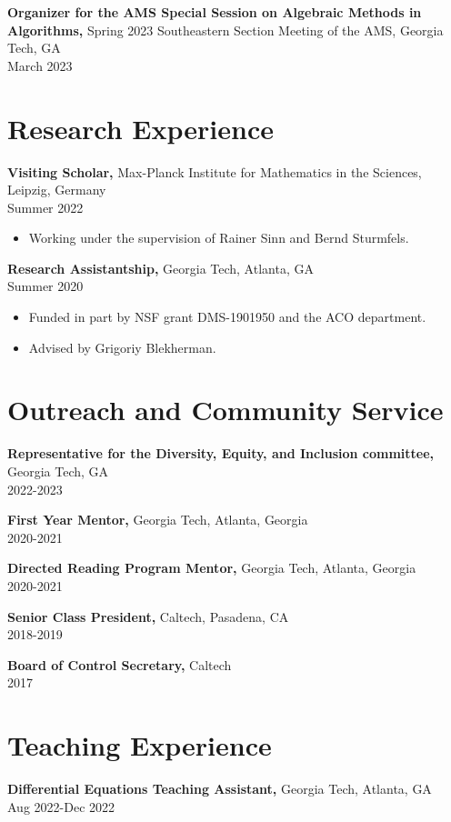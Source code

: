 \documentclass[margin]{res}
\begin{document}
\begin{resume}
{\bf Organizer for the AMS Special Session on Algebraic Methods in Algorithms,} Spring 2023 Southeastern Section Meeting of the AMS, Georgia Tech, GA    \\       March 2023

\section{Research Experience}
{\bf Visiting Scholar,} Max-Planck Institute for Mathematics in the Sciences, Leipzig, Germany \\ Summer 2022
\begin{itemize} \itemsep -2pt %
\item Working under the supervision of Rainer Sinn and Bernd Sturmfels.
\end{itemize}
{\bf Research Assistantship,} Georgia Tech, Atlanta, GA \\ Summer 2020
\begin{itemize} \itemsep -2pt %
\item Funded in part by NSF grant DMS-1901950 and the ACO department.
\item Advised by Grigoriy Blekherman.
\end{itemize}

\section{Outreach and Community Service} 
       {\bf Representative for the Diversity, Equity, and Inclusion committee,} Georgia Tech, GA    \\         2022-2023

       {\bf First Year Mentor,} Georgia Tech, Atlanta, Georgia     \\         2020-2021 

       {\bf Directed Reading Program Mentor,} Georgia Tech, Atlanta, Georgia     \\         2020-2021 

       {\bf Senior Class President,} Caltech, Pasadena, CA    \\         2018-2019 

		{\bf Board of Control Secretary,} Caltech \\   2017

\section{Teaching Experience}
{\bf Differential Equations Teaching Assistant,} Georgia Tech, Atlanta, GA \\ Aug 2022-Dec 2022


\end{resume}
\end{document}
